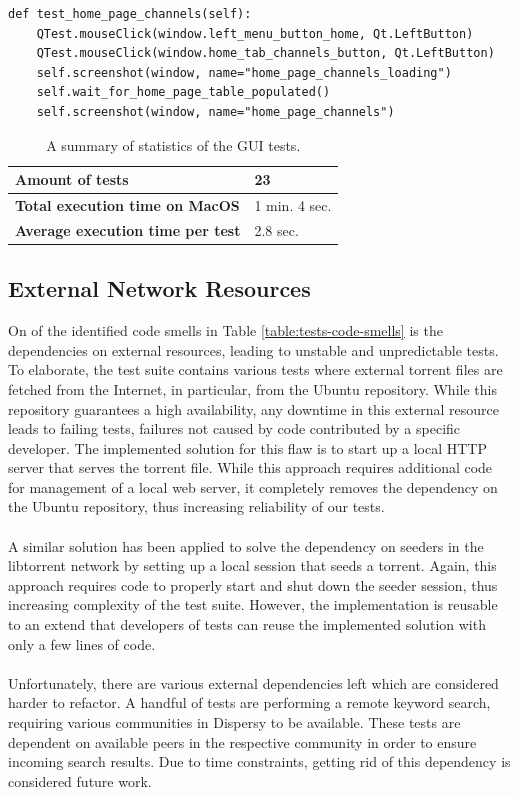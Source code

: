 \begin{lstlisting}[caption={A sample of a test that tests the new Qt Tribler GUI.},label={lst:qtest-sample}]
def test_home_page_channels(self):
	QTest.mouseClick(window.left_menu_button_home, Qt.LeftButton)
	QTest.mouseClick(window.home_tab_channels_button, Qt.LeftButton)
	self.screenshot(window, name="home_page_channels_loading")
	self.wait_for_home_page_table_populated()
	self.screenshot(window, name="home_page_channels")
\end{lstlisting}

\begin{table}[h!]
	\centering
	\begin{tabular}{|l|l|}
		\hline
		\textbf{Amount of tests} & 23 \\ \hline
		\textbf{Total execution time on MacOS} & 1 min. 4 sec. \\ \hline
		\textbf{Average execution time per test} & 2.8 sec.\\ \hline
	\end{tabular}
	\caption{A summary of statistics of the GUI tests.}
	\label{table:gui-tests-summary}
\end{table}

\subsection{External Network Resources}
\label{subsec:external-network-resources}
On of the identified code smells in Table \ref{table:tests-code-smells} is the dependencies on external resources, leading to unstable and unpredictable tests. To elaborate, the test suite contains various tests where external torrent files are fetched from the Internet, in particular, from the Ubuntu repository. While this repository guarantees a high availability, any downtime in this external resource leads to failing tests, failures not caused by code contributed by a specific developer. The implemented solution for this flaw is to start up a local HTTP server that serves the torrent file. While this approach requires additional code for management of a local web server, it completely removes the dependency on the Ubuntu repository, thus increasing reliability of our tests.\\\\
A similar solution has been applied to solve the dependency on seeders in the libtorrent network by setting up a local session that seeds a torrent. Again, this approach requires code to properly start and shut down the seeder session, thus increasing complexity of the test suite. However, the implementation is reusable to an extend that developers of tests can reuse the implemented solution with only a few lines of code.\\\\
Unfortunately, there are various external dependencies left which are considered harder to refactor. A handful of tests are performing a remote keyword search, requiring various communities in Dispersy to be available. These tests are dependent on available peers in the respective community in order to ensure incoming search results. Due to time constraints, getting rid of this dependency is considered future work.

